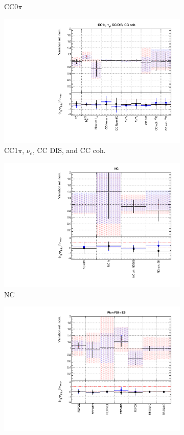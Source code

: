 \begin{figure}[t]
\begin{subfigure}{0.49\textwidth}
  \caption{CC0$\pi$}
\end{subfigure}
\begin{subfigure}{0.49\textwidth}
  \centering
  \includegraphics[width=0.95\linewidth]{figs/rhcmpasmvxsec2}
  \caption{CC1$\pi$, $\nu_e$, CC DIS, and CC coh.}
\end{subfigure}
\begin{subfigure}{0.49\textwidth}
  \centering
  \includegraphics[width=0.95\linewidth]{figs/rhcmpasmvxsec3}
  \caption{NC}
\end{subfigure}
\begin{subfigure}{0.49\textwidth}
  \centering
  \includegraphics[width=0.95\linewidth]{figs/rhcmpasmvxsec4}

\end{subfigure}
\end{figure}
